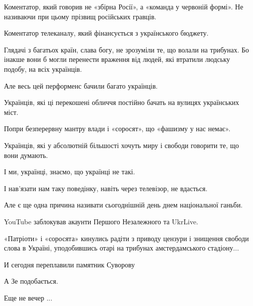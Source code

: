 Коментатор, який говорив не «збірна Росії», а «команда у червоній формі». Не
називаючи при цьому прізвищ російських гравців.

Коментатор телеканалу, який фінансується з українського бюджету.

Глядачі з багатьох країн, слава богу, не зрозуміли те, що волали на трибунах.
Бо інакше вони б могли перенести враження від людей, які втратили людську
подобу, на всіх українців.

Але весь цей перформенс бачили багато українців.

Українців, які ці перекошені обличчя постійно бачать на вулицях українських
міст. 

Попри безперервну мантру влади і «соросят», що «фашизму у нас немає».

Українців, які у абсолютній більшості хочуть миру і свободи говорити те, що
вони думають.

І ми, українці, знаємо, що українці не такі.

І нав’язати нам таку поведінку, навіть через телевізор, не вдасться.

Але є ще одна причина називати сьогоднішній день днем національної ганьби.

YouTube заблокував акаунти Першого Незалежного та UkrLive.

«Патріоти» і «соросята» кинулись радіти з приводу цензури і знищення свободи
слова в Україні, уподобившись отарі на трибунах амстердамського стадіону...

\begin{itemize} %
И сегодня переплавили памятник Суворову

А Зе подобається.

Еще не вечер ...
\end{itemize} %
